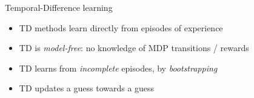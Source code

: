 \bgroup
\begin{frame}{Temporal-Difference learning}
\begin{itemize}
\item TD methods learn directly from episodes of experience
\item TD is \emph{model-free}: no knowledge of MDP transitions / rewards
\item TD learns from \emph{incomplete} episodes, by \emph{bootstrapping}
\item TD updates a guess towards a guess
\end{itemize}
\end{frame}
\egroup